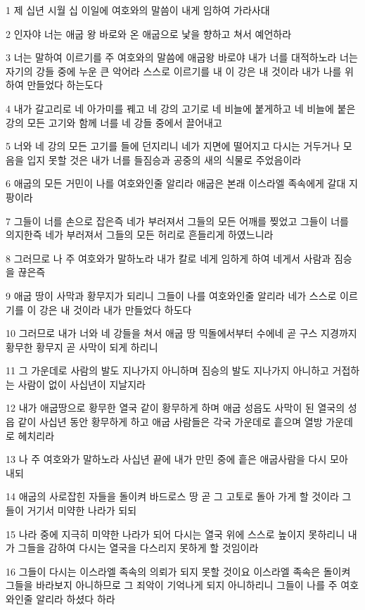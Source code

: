 \par 1 제 십년 시월 십 이일에 여호와의 말씀이 내게 임하여 가라사대
\par 2 인자야 너는 애굽 왕 바로와 온 애굽으로 낯을 향하고 쳐서 예언하라
\par 3 너는 말하여 이르기를 주 여호와의 말씀에 애굽왕 바로야 내가 너를 대적하노라 너는 자기의 강들 중에 누운 큰 악어라 스스로 이르기를 내 이 강은 내 것이라 내가 나를 위하여 만들었다 하는도다
\par 4 내가 갈고리로 네 아가미를 꿰고 네 강의 고기로 네 비늘에 붙게하고 네 비늘에 붙은 강의 모든 고기와 함께 너를 네 강들 중에서 끌어내고
\par 5 너와 네 강의 모든 고기를 들에 던지리니 네가 지면에 떨어지고 다시는 거두거나 모음을 입지 못할 것은 내가 너를 들짐승과 공중의 새의 식물로 주었음이라
\par 6 애굽의 모든 거민이 나를 여호와인줄 알리라 애굽은 본래 이스라엘 족속에게 갈대 지팡이라
\par 7 그들이 너를 손으로 잡은즉 네가 부러져서 그들의 모든 어깨를 찢었고 그들이 너를 의지한즉 네가 부러져서 그들의 모든 허리로 흔들리게 하였느니라
\par 8 그러므로 나 주 여호와가 말하노라 내가 칼로 네게 임하게 하여 네게서 사람과 짐승을 끊은즉
\par 9 애굽 땅이 사막과 황무지가 되리니 그들이 나를 여호와인줄 알리라 네가 스스로 이르기를 이 강은 내 것이라 내가 만들었다 하도다
\par 10 그러므로 내가 너와 네 강들을 쳐서 애굽 땅 믹돌에서부터 수에네 곧 구스 지경까지 황무한 황무지 곧 사막이 되게 하리니
\par 11 그 가운데로 사람의 발도 지나가지 아니하며 짐승의 발도 지나가지 아니하고 거접하는 사람이 없이 사십년이 지날지라
\par 12 내가 애굽땅으로 황무한 열국 같이 황무하게 하며 애굽 성읍도 사막이 된 열국의 성읍 같이 사십년 동안 황무하게 하고 애굽 사람들은 각국 가운데로 흩으며 열방 가운데로 헤치리라
\par 13 나 주 여호와가 말하노라 사십년 끝에 내가 만민 중에 흩은 애굽사람을 다시 모아 내되
\par 14 애굽의 사로잡힌 자들을 돌이켜 바드로스 땅 곧 그 고토로 돌아 가게 할 것이라 그들이 거기서 미약한 나라가 되되
\par 15 나라 중에 지극히 미약한 나라가 되어 다시는 열국 위에 스스로 높이지 못하리니 내가 그들을 감하여 다시는 열국을 다스리지 못하게 할 것임이라
\par 16 그들이 다시는 이스라엘 족속의 의뢰가 되지 못할 것이요 이스라엘 족속은 돌이켜 그들을 바라보지 아니하므로 그 죄악이 기억나게 되지 아니하리니 그들이 나를 주 여호와인줄 알리라 하셨다 하라
